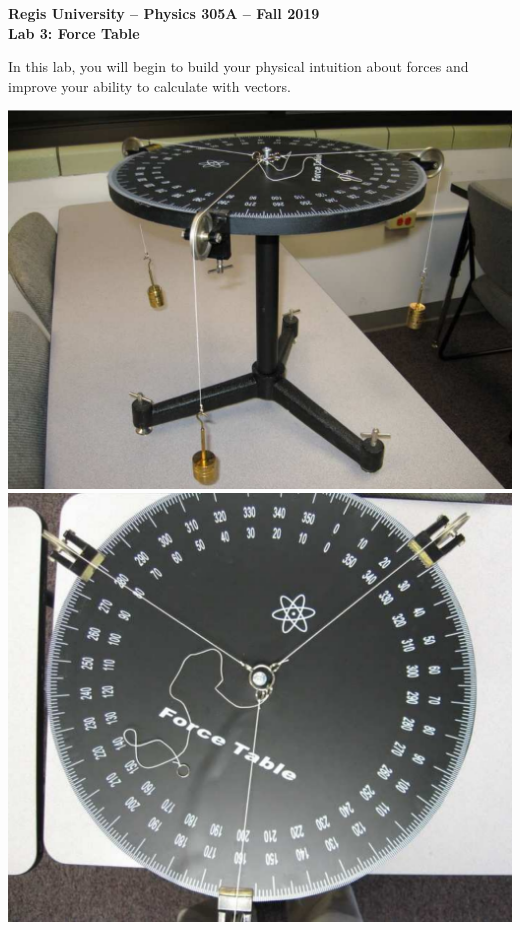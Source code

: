 \documentclass[11pt]{article}
\begin{document}
\begin{center}
{\bf{Regis University -- Physics 305A -- Fall 2019}} \\
{\bf{Lab 3: Force Table}} \\
\medskip
\end{center}

\medskip

In this lab, you will begin to build your physical intuition about forces and 
improve your ability to calculate with vectors.

\bigskip

\begin{center}
\includegraphics[height=0.30\textheight]{force_table_side1.pdf}
\includegraphics[height=0.30\textheight]{force_table_top1.pdf}
\end{center}
\end{document}
